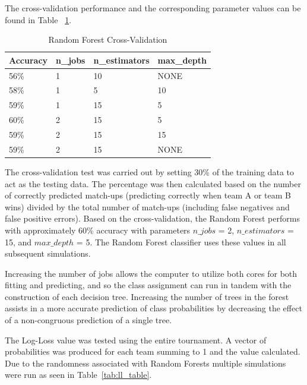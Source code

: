\documentclass[conference]{IEEEtran}
\begin{document}
{The cross-validation performance and the corresponding parameter values can be found in Table ~\ref{tab:RF_CV}.

\begin{table}[H]
	\centering
    \begin{tabular}{|l|l|l|l|}
    \hline
    \textbf{Accuracy} & \textbf{n\_jobs} & \textbf{n\_estimators} & \textbf{max\_depth} \\ \hline
    56\%     & 1       & 10            & NONE       \\ \hline
    58\%     & 1       & 5             & 10         \\ \hline
    59\%     & 1       & 15            & 5          \\ \hline
    60\%     & 2       & 15            & 5          \\ \hline
    59\%     & 2       & 15            & 15         \\ \hline
    59\%     & 2       & 15            & NONE       \\ \hline
    \end{tabular}
    \caption {Random Forest Cross-Validation}
    \label{tab:RF_CV}
\end{table}

The cross-validation test was carried out by setting 30\% of the training data to act as the testing data.
The percentage was then calculated based on the number of correctly predicted match-ups (predicting correctly when team A or team B wins) divided by the total number of match-ups (including false negatives and false positive errors). 
Based on the cross-validation, the Random Forest performs with approximately 60\% accuracy with parameters $n\_jobs$ = 2, $n\_estimators$ = 15, and $max\_depth$ = 5.
The Random Forest classifier uses these values in all subsequent simulations.

Increasing the number of jobs allows the computer to utilize both cores for both fitting and predicting, and so the class assignment can run in tandem with the construction of each decision tree. 
Increasing the number of trees in the forest assists in a more accurate prediction of class probabilities by decreasing the effect of a non-congruous prediction of a single tree.

The Log-Loss value was tested using the entire tournament.
A vector of probabilities was produced for each team summing to 1 and the value calculated.
Due to the randomness associated with Random Forests multiple simulations were run as seen in Table~\ref{tab:ll_table}.

}
\end{document}
